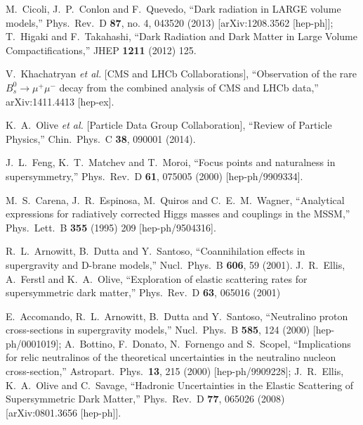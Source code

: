 \documentclass[11pt,a4paper]{article}
\begin{document}
\begin{thebibliography}{99}
M.~Cicoli, J.~P.~Conlon and F.~Quevedo,
  ``Dark radiation in LARGE volume models,''
  Phys.\ Rev.\ D {\bf 87}, no. 4, 043520 (2013)
  [arXiv:1208.3562 [hep-ph]];
T.~Higaki and F.~Takahashi,
  ``Dark Radiation and Dark Matter in Large Volume Compactifications,''
  JHEP {\bf 1211} (2012) 125.

  V.~Khachatryan {\it et al.}  [CMS and LHCb Collaborations],
  ``Observation of the rare $B^0_s\to\mu^+\mu^-$ decay from the combined analysis of CMS and LHCb data,''
  arXiv:1411.4413 [hep-ex].

  K.~A.~Olive {\it et al.}  [Particle Data Group Collaboration],
  ``Review of Particle Physics,''
  Chin.\ Phys.\ C {\bf 38}, 090001 (2014).

 J.~L.~Feng, K.~T.~Matchev and T.~Moroi,
  ``Focus points and naturalness in supersymmetry,''
  Phys.\ Rev.\ D {\bf 61}, 075005 (2000)
  [hep-ph/9909334].

  M.~S.~Carena, J.~R.~Espinosa, M.~Quiros and C.~E.~M.~Wagner,
  ``Analytical expressions for radiatively corrected Higgs masses and couplings in the MSSM,''
  Phys.\ Lett.\ B {\bf 355} (1995) 209
  [hep-ph/9504316].

R.~L.~Arnowitt, B.~Dutta and Y.~Santoso,
  ``Coannihilation effects in supergravity and D-brane models,''
  Nucl.\ Phys.\ B {\bf 606}, 59 (2001).
J.~R.~Ellis, A.~Ferstl and K.~A.~Olive,
  ``Exploration of elastic scattering rates for supersymmetric dark matter,''
  Phys.\ Rev.\ D {\bf 63}, 065016 (2001)

  E.~Accomando, R.~L.~Arnowitt, B.~Dutta and Y.~Santoso,
  ``Neutralino proton cross-sections in supergravity models,''
  Nucl.\ Phys.\ B {\bf 585}, 124 (2000)
  [hep-ph/0001019]; A.~Bottino, F.~Donato, N.~Fornengo and S.~Scopel,
  ``Implications for relic neutralinos of the theoretical uncertainties in the neutralino nucleon cross-section,''
  Astropart.\ Phys.\  {\bf 13}, 215 (2000)
  [hep-ph/9909228];
   J.~R.~Ellis, K.~A.~Olive and C.~Savage,
  ``Hadronic Uncertainties in the Elastic Scattering of Supersymmetric Dark Matter,''
  Phys.\ Rev.\ D {\bf 77}, 065026 (2008)
  [arXiv:0801.3656 [hep-ph]].


\end{thebibliography}
\end{document}
